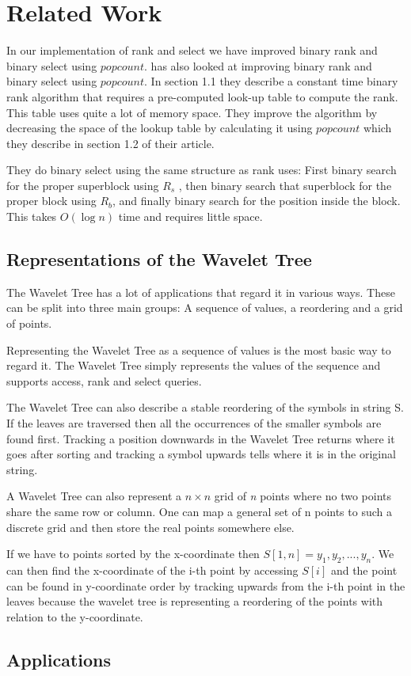 \section{Related Work}
In our implementation of rank and select we have improved binary rank and binary select using $popcount$.
\cite{Gonzalez05practicalimplementation} has also looked at improving binary rank and binary select using $popcount$. 
In section 1.1 they describe a constant time binary rank algorithm that requires a pre-computed look-up table to compute the rank. 
This table uses quite a lot of memory space. 
They improve the algorithm by decreasing the space of the lookup table by calculating it using $popcount$ which they describe in section 1.2 of their article. 

They do binary select using the same structure as rank uses: First binary search for the proper superblock using $R_s$ , then binary search that superblock for the proper block using $R_b$, and finally binary search for the position inside the block. 
This takes $O(\log n)$ time and requires little space.

\subsection{Representations of the Wavelet Tree}
The Wavelet Tree has a lot of applications that regard it in various ways.
These can be split into three main groups: A sequence of values, a reordering and a grid of points.

Representing the Wavelet Tree as a sequence of values is the most basic way to regard it. 
The Wavelet Tree simply represents the values of the sequence and supports access, rank and select queries.

The Wavelet Tree can also describe a stable reordering of the symbols in string S. 
If the leaves are traversed then all the occurrences of the smaller symbols are found first. 
Tracking a position downwards in the Wavelet Tree returns where it goes after sorting and tracking a symbol upwards tells where it is in the original string. 

A Wavelet Tree can also represent a $n \times n$ grid of \textit{n} points where no two points share the same row or column. 
One can map a general set of n points to such a discrete grid and then store the real points somewhere else.

If we have to points sorted by the x-coordinate then $S[1,n] = y_1,y_2,...,y_n$.
We can then find the x-coordinate of the i-th point by accessing $S[i]$ and the point can be found in y-coordinate order by tracking upwards from the i-th point in the leaves because the wavelet tree is representing a reordering of the points with relation to the y-coordinate.

\subsection{Applications}
